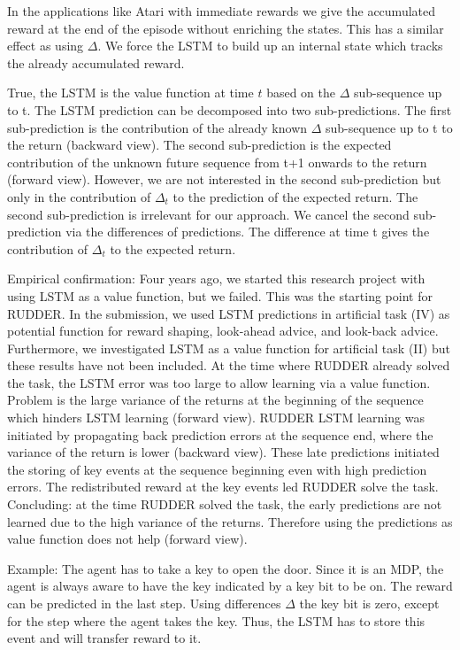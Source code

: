 \documentclass{article}
\begin{document}
\begin{appendices}
In the applications like Atari with immediate rewards 
we give the accumulated reward at the end of the episode without enriching the states. 
This has a similar effect as using $\Delta$. 
We force the LSTM to build up an internal state 
which tracks the already accumulated reward. 

True, the LSTM is the value function at time $t$ based on the 
$\Delta$ sub-sequence up to t. 
The LSTM prediction can be decomposed into two sub-predictions. 
The first sub-prediction is the contribution of the already known 
$\Delta$ sub-sequence up to t to the return (backward view). 
The second sub-prediction is the expected contribution 
of the unknown future sequence from t+1 onwards 
to the return (forward view). 
However, we are not interested in the second sub-prediction 
but only in the contribution of $\Delta_t$ to the prediction of the expected return. 
The second sub-prediction is irrelevant for our approach. 
We cancel the second sub-prediction via the differences of predictions. 
The difference at time t gives the contribution of $\Delta_t$ to the expected return.

Empirical confirmation:
Four years ago, 
we started this research project with using LSTM as a value function, but we failed. 
This was the starting point for RUDDER. 
In the submission, we used LSTM predictions in artificial task (IV) 
as potential function for reward shaping, look-ahead advice, and look-back advice. 
Furthermore, we investigated LSTM as a value function for artificial task (II) 
but these results have not been included.
At the time where RUDDER already solved the task, 
the LSTM error was too large to allow learning via a value function. 
Problem is the large variance of the returns at the beginning of the sequence 
which hinders LSTM learning (forward view). 
RUDDER LSTM learning was initiated by propagating back prediction errors at the sequence end, 
where the variance of the return is lower (backward view). 
These late predictions initiated the storing of key events at the sequence beginning 
even with high prediction errors. 
The redistributed reward at the key events led RUDDER solve the task. 
Concluding: at the time RUDDER solved the task, 
the early predictions are not learned due to the high variance of the returns. 
Therefore using the predictions as value function does not help (forward view).

Example: The agent has to take a key to open the door. 
Since it is an MDP, 
the agent is always aware to have the key indicated by a key bit to be on. 
The reward can be predicted in the last step. 
Using differences $\Delta$ the key bit is zero, 
except for the step where the agent takes the key. 
Thus, the LSTM has to store this event and will transfer reward to it.


\end{appendices}
\end{document}
